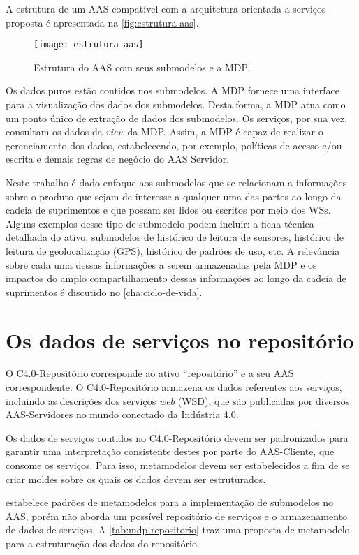 	A estrutura de um AAS compatível com a arquitetura orientada a serviços proposta é apresentada na \autoref{fig:estrutura-aas}.
	
	\begin{figure}[htb]
		\centering
		\caption{Estrutura do AAS com seus submodelos e a MDP.}
		\label{fig:estrutura-aas}
		\texttt{[image: estrutura-aas]}
	\end{figure}

	Os dados puros estão contidos nos submodelos. A MDP fornece uma interface para a visualização dos dados dos submodelos. Desta forma, a MDP atua como um ponto único de extração de dados dos submodelos. Os serviços, por sua vez, consultam os dados da \textit{view} da MDP. Assim, a MDP é capaz de realizar o gerenciamento dos dados, estabelecendo, por exemplo, políticas de acesso e/ou escrita e demais regras de negócio do AAS Servidor.
	
	Neste trabalho é dado enfoque aos submodelos que se relacionam a informações sobre o produto que sejam de interesse a qualquer uma das partes ao longo da cadeia de suprimentos e que possam ser lidos ou escritos por meio dos WSs. Alguns exemplos desse tipo de submodelo podem incluir: a ficha técnica detalhada do ativo, submodelos de histórico de leitura de sensores, histórico de leitura de geolocalização (GPS), histórico de padrões de uso, etc. A relevância sobre cada uma dessas informações a serem armazenadas pela MDP e os impactos do amplo compartilhamento dessas informações ao longo da cadeia de suprimentos é discutido no \autoref{cha:ciclo-de-vida}.


\section{Os dados de serviços no repositório}
	
	O C4.0-Repositório corresponde ao ativo ``repositório'' e a seu AAS correspondente. O C4.0-Repositório armazena os dados referentes aos serviços, incluindo as descrições dos serviços \textit{web} (WSD), que são publicadas por diversos AAS-Servidores no mundo conectado da Indústria 4.0.
	
	Os dados de serviços contidos no C4.0-Repositório devem ser padronizados para garantir uma interpretação consistente destes por parte do AAS-Cliente, que consome os serviços. Para isso, metamodelos devem ser estabelecidos a fim de se criar moldes sobre os quais os dados devem ser estruturados.
	
	 estabelece padrões de metamodelos para a implementação de submodelos no AAS, porém não aborda um possível repositório de serviços e o armazenamento de dados de serviços. A \autoref{tab:mdp-repositorio} traz uma proposta de metamodelo para a estruturação dos dados do repositório.
	
